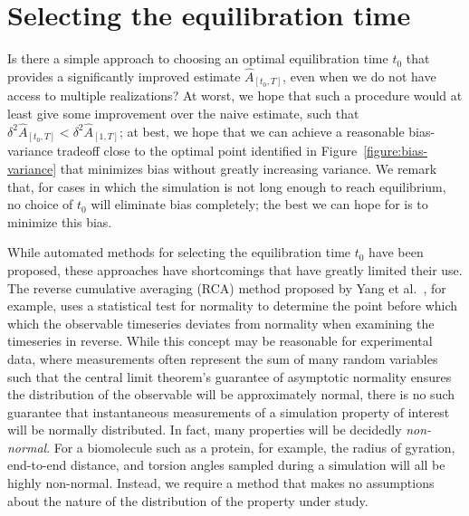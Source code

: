 \documentclass[aps,pre,twocolumn,nofootinbib,superscriptaddress,linenumbers,11point]{revtex4-1}
\begin{document}

\section*{Selecting the equilibration time}

Is there a simple approach to choosing an optimal equilibration time $t_0$ that provides a significantly improved estimate $\hat{A}_{[t_0,T]}$, even when we do not have access to multiple realizations?
At worst, we hope that such a procedure would at least give some improvement over the naive estimate, such that $\delta^2 \hat{A}_{[t_0,T]} < \delta^2 \hat{A}_{[1,T]}$; at best, we hope that we can achieve a reasonable bias-variance tradeoff close to the optimal point identified in Figure~\ref{figure:bias-variance} that minimizes bias without greatly increasing variance.
We remark that, for cases in which the simulation is not long enough to reach equilibrium, no choice of $t_0$ will eliminate bias completely; the best we can hope for is to minimize this bias.

While automated methods for selecting the equilibration time $t_0$ have been proposed, these approaches have shortcomings that have greatly limited their use.
The reverse cumulative averaging (RCA) method proposed by Yang et al.~\cite{yang-karplus:2004:jcp:reverse-cumulative-averaging}, for example, uses a statistical test for normality to determine the point before which which the observable timeseries deviates from normality when examining the timeseries in reverse.
While this concept may be reasonable for experimental data, where measurements often represent the sum of many random variables such that the central limit theorem's guarantee of asymptotic normality ensures the distribution of the observable will be approximately normal, there is no such guarantee that instantaneous measurements of a simulation property of interest will be normally distributed.
In fact, many properties will be decidedly \emph{non-normal}.
For a biomolecule such as a protein, for example, the radius of gyration, end-to-end distance, and torsion angles sampled during a simulation will all be highly non-normal.
Instead, we require a method that makes no assumptions about the nature of the distribution of the property under study.
\end{document}
